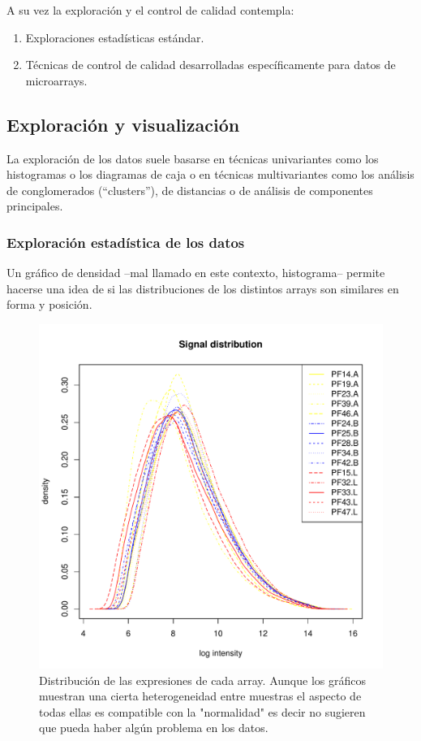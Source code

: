 \documentclass[a4paper]{article}\usepackage[]{graphicx}\usepackage[]{color}
\makeatletter
\def\maxwidth{ %
  \ifdim\Gin@nat@width>\linewidth
    \linewidth
  \else
    \Gin@nat@width
  \fi
}
\newenvironment{knitrout}{}{} %
\makeatother
\begin{document}
A su vez la exploración y el control de calidad contempla:
\begin{enumerate}
\item Exploraciones estadísticas estándar.
\item Técnicas de control de calidad desarrolladas específicamente para datos de microarrays.
\end{enumerate}

\subsection{Exploración y visualización}

La exploración de los datos suele basarse en técnicas univariantes
como los histogramas o los diagramas de caja o en técnicas
multivariantes como los análisis de conglomerados (``clusters''), de
distancias o de análisis de componentes principales.

\subsubsection{Exploración estadística de los datos}



Un gráfico de densidad --mal llamado en este contexto, histograma--
permite hacerse una idea de si las distribuciones de los distintos
arrays son similares en forma y posición.

\begin{figure}[htbp]
\begin{knitrout}
\color{fgcolor}
\includegraphics[width=\maxwidth]{images/graficplotHist-1} 

\end{knitrout}
\caption{Distribución de las expresiones de cada array. Aunque los gráficos muestran una cierta heterogeneidad entre muestras el aspecto de todas ellas es compatible con la "normalidad" es decir no sugieren que pueda haber algún problema en los datos.}
\end{figure}
\end{document}
